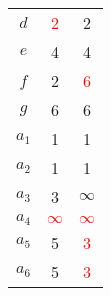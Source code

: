 \begin{center}
\begin{minipage}[t]{.4\linewidth}
\begin{longtable}[c]{| c | c | c |}
     $d$ & \textcolor{red}{2} & 2\\
     $e$ & 4 & 4\\
     $f$ & 2 & \textcolor{red}{6}\\
     $g$ & 6 & 6\\
     $a_1$ & 1 & 1\\
     $a_2$ & 1 & 1\\
     $a_3$ & 3 & $\infty$\\
     $a_4$ & \textcolor{red}{$\infty$} & \textcolor{red}{$\infty$}\\
     $a_5$ & 5 & \textcolor{red}{3}\\
     $a_6$ & 5 & \textcolor{red}{3}\\
     \hline
\end{longtable}
\end{minipage}
\end{center}